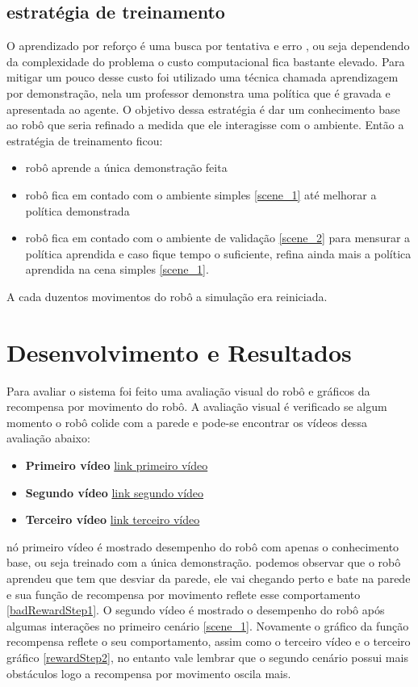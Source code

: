 \documentclass[
	12pt,				%
	openright,			%
	oneside,			%
	a4paper,			%
	brazil,				%
	]{abntex2}
\begin{document}
\section{estratégia de treinamento}
O aprendizado por reforço é uma busca por tentativa e erro \cite{sutton2018reinforcement}, ou seja dependendo da complexidade do problema o custo computacional fica bastante elevado. Para mitigar um pouco desse custo foi utilizado uma técnica chamada aprendizagem por demonstração, nela um professor demonstra uma política que é gravada e apresentada ao agente. O objetivo dessa estratégia é dar um conhecimento base ao robô que seria refinado a medida que ele interagisse com o ambiente. Então a estratégia de treinamento ficou:
\begin{itemize}
	\item robô aprende a única demonstração feita 
	\item robô fica em contado com o ambiente simples \ref{scene_1} até melhorar a política demonstrada 
	\item robô fica em contado com o ambiente de validação \ref{scene_2} para mensurar a política aprendida e caso fique tempo o suficiente, refina ainda mais a política aprendida na cena simples \ref{scene_1}. 
\end{itemize}
A cada duzentos movimentos do robô a simulação era reiniciada.

\chapter{Desenvolvimento e Resultados}
Para avaliar o sistema foi feito uma avaliação visual do robô e gráficos da recompensa por movimento do robô. A avaliação visual é verificado se algum momento o robô colide com a parede e pode-se encontrar os vídeos dessa avaliação abaixo:  
\begin{itemize}
 \item \textbf{Primeiro vídeo} \href{https://www.youtube.com/watch?v=DLh3mFDmg-4}{link primeiro vídeo}
 \item \textbf{Segundo vídeo} \href{https://www.youtube.com/watch?v=MQMNd3tqTlU}{link segundo vídeo}
 \item \textbf{Terceiro vídeo} \href{https://www.youtube.com/watch?v=5zjPKKYeF10}{link terceiro vídeo}
 \end{itemize}

nó primeiro vídeo é mostrado desempenho do robô com apenas o conhecimento base, ou seja treinado com a única demonstração. podemos observar que o robô aprendeu que tem que desviar da parede, ele vai chegando perto e bate na parede e sua função de recompensa por movimento reflete esse comportamento \ref{badRewardStep1}.
O segundo vídeo é mostrado o desempenho do robô após algumas interações no primeiro cenário \ref{scene_1}. Novamente o gráfico da função recompensa reflete o seu comportamento, assim como o terceiro vídeo e o terceiro gráfico \ref{rewardStep2}, no entanto vale lembrar que o segundo cenário possui mais obstáculos logo a recompensa por movimento oscila mais.
\end{document}
